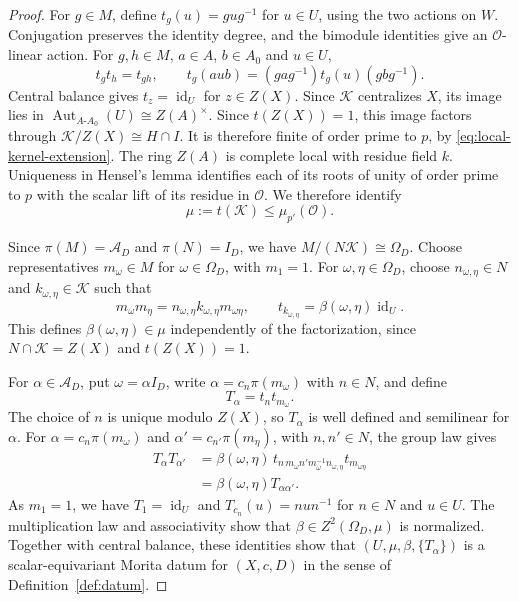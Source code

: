 \documentclass[11pt,a4paper]{article}
\theoremstyle{definition}
\theoremstyle{remark}
\numberwithin{equation}{section}
\newcommand{\cO}{\mathcal{O}}
\DeclareMathOperator{\Aut}{Aut}
\DeclareMathOperator{\id}{id}
\begin{document}
\begin{proof}
		For $g\in M$, define $t_g(u)=gug^{-1}$ for $u\in U$,
		using the two actions on $W$. Conjugation preserves the
		identity degree, and the bimodule identities give an
		$\cO$-linear action. For $g,h\in M$, $a\in A$, $b\in A_0$
		and $u\in U$,
		\[
		t_gt_h=t_{gh},\qquad
		t_g(aub)=(gag^{-1})t_g(u)(gbg^{-1}).
		\]
		Central balance gives $t_z=\id_U$ for $z\in Z(X)$.
		Since $\mathcal K$ centralizes $X$, its image lies in
		$\Aut_{A\text{-}A_0}(U)\cong Z(A)^\times$.
		Since $t(Z(X))=1$, this image factors through
		$\mathcal K/Z(X)\cong H\cap I$. It is therefore finite of order
		prime to $p$, by \eqref{eq:local-kernel-extension}.
		The ring $Z(A)$ is complete local with residue field $k$.
		Uniqueness in Hensel's lemma identifies each of its
		roots of unity of order prime to $p$ with the scalar lift
		of its residue in $\cO$. We therefore identify
		\[
		\mu:=t(\mathcal K)\leq\mu_{p'}(\cO).
		\]
		
		Since $\pi(M)=\mathcal A_D$ and $\pi(N)=I_D$,
		we have $M/(N\mathcal K)\cong\Omega_D$.
		Choose representatives $m_\omega\in M$ for $\omega\in\Omega_D$,
		with $m_1=1$. For $\omega,\eta\in\Omega_D$, choose
		$n_{\omega,\eta}\in N$ and $k_{\omega,\eta}\in\mathcal K$ such that
		\[
		m_\omega m_\eta=n_{\omega,\eta}k_{\omega,\eta}m_{\omega\eta},
		\qquad t_{k_{\omega,\eta}}=\beta(\omega,\eta)\id_U.
		\]
		This defines $\beta(\omega,\eta)\in\mu$ independently of the
		factorization, since $N\cap\mathcal K=Z(X)$ and $t(Z(X))=1$.
		
		For $\alpha\in\mathcal A_D$, put $\omega=\alpha I_D$,
		write $\alpha=c_n\pi(m_\omega)$ with $n\in N$, and define
		\[
		T_\alpha=t_n t_{m_\omega}.
		\]
		The choice of $n$ is unique modulo $Z(X)$, so $T_\alpha$
		is well defined and semilinear for $\alpha$.
		For $\alpha=c_n\pi(m_\omega)$ and
		$\alpha'=c_{n'}\pi(m_\eta)$, with $n,n'\in N$, the group law gives
		\[
		\begin{aligned}
			T_\alpha T_{\alpha'}
			&=\beta(\omega,\eta)\,
			t_{n\,m_\omega n'm_\omega^{-1}n_{\omega,\eta}}t_{m_{\omega\eta}}\\
			&=\beta(\omega,\eta)T_{\alpha\alpha'}.
		\end{aligned}
		\]
		As $m_1=1$, we have $T_1=\id_U$ and
		$T_{c_n}(u)=nun^{-1}$ for $n\in N$ and $u\in U$.
		The multiplication law and associativity show that
		$\beta\in Z^2(\Omega_D,\mu)$ is normalized.
		Together with central balance, these identities show that
		$(U,\mu,\beta,\{T_\alpha\})$ is a scalar-equivariant Morita datum
		for $(X,c,D)$ in the sense of Definition~\ref{def:datum}.
	\end{proof}
	
\end{document}
